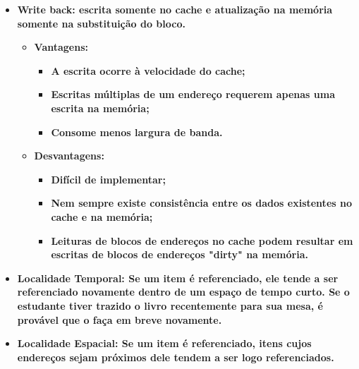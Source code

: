 \documentclass[12pt,a4paper]{article}
\begin{document}
\begin{titlepage}
\begin{enumerate}[1)]
\begin{itemize}
  	\item
  	\textbf{Write back: escrita somente no cache e atualização na memória somente na substituição do bloco.}
  	\begin{itemize}
  		\item 
  		\textbf{Vantagens:}
  		\begin{itemize}
  			\item 
  			\textbf{A escrita ocorre à velocidade do cache;}
  			\item 
  			\textbf{Escritas múltiplas de um endereço requerem apenas uma escrita na memória;}
  			\item 
  			\textbf{Consome menos largura de banda.}
  		\end{itemize}
  		\item
  		\textbf{Desvantagens:}
  		\begin{itemize}
  			\item 
  			\textbf{Difícil de implementar;}
  			\item 
  			\textbf{Nem sempre existe consistência entre os dados existentes no cache e na memória;}
  			\item 
  			\textbf{Leituras de blocos de endereços no cache podem resultar em escritas de blocos de endereços "dirty" na memória.}
  		\end{itemize}
  	\end{itemize}
 	\item
  	\textbf{Localidade Temporal: Se um item é referenciado, ele tende a ser referenciado novamente dentro de um espaço de tempo curto. Se o estudante tiver trazido o livro recentemente para sua mesa, é provável que o faça em breve novamente.}
  	\item
  	\textbf{Localidade Espacial: Se um item é referenciado, itens cujos endereços sejam próximos dele tendem a ser logo referenciados.}
	 	
	 \end{itemize}
\end{enumerate}
\end{titlepage}
\end{document}
